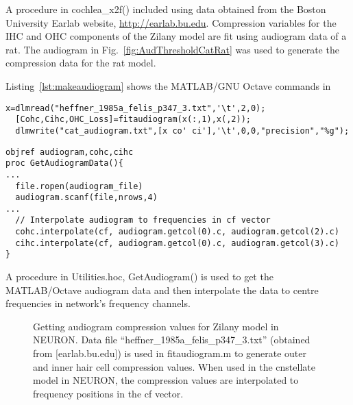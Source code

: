 A procedure in \mbox{\textsf{cochlea\_x2f()}} included using data obtained from
the Boston University Earlab website, \url{http://earlab.bu.edu}.
Compression variables for the IHC and OHC components of the Zilany
model are fit using audiogram data of a rat.  The audiogram in
Fig.~\ref{fig:AudThresholdCatRat} was used to generate the compression
data for the rat model.


Listing~\ref{lst:makeaudiogram} shows the MATLAB/GNU Octave commands in
\begin{lstlisting}[label=lst:makeaudiogram,caption=Using \mbox{\textsf{fitaudiogram.m}} to create COHC and CIHC vectors for the cat.]
  x=dlmread("heffner_1985a_felis_p347_3.txt",'\t',2,0);
  [Cohc,Cihc,OHC_Loss]=fitaudiogram(x(:,1),x(,2));
  dlmwrite("cat_audiogram.txt",[x co' ci'],'\t',0,0,"precision","%g");
\end{lstlisting}



\begin{lstlisting}[label=lst:getaudiogramdata,caption= Procedure to get audiogram data and interpolate to frequencies in \textsf{cf} vector (\mbox{\textsf{Utilities.hoc}})]
objref audiogram,cohc,cihc
proc GetAudiogramData(){
...
  file.ropen(audiogram_file)
  audiogram.scanf(file,nrows,4)
...
  // Interpolate audiogram to frequencies in cf vector
  cohc.interpolate(cf, audiogram.getcol(0).c, audiogram.getcol(2).c)
  cihc.interpolate(cf, audiogram.getcol(0).c, audiogram.getcol(3).c)
}
\end{lstlisting}

A procedure in \mbox{\textsf{Utilities.hoc}}, \mbox{\textsf{GetAudiogram()}} is used
to get the MATLAB/Octave audiogram data and then interpolate the data
to centre frequencies in network's frequency channels.

\begin{figure}[th]
  \begin{center}
    \caption[Zilany auditory model conversion in NEURON]%
    {Getting audiogram compression values for Zilany model in
      NEURON\@.  Data file
      \mbox{\textsf{``heffner\_1985a\_felis\_p347\_3.txt''}} (obtained
      from [earlab.bu.edu]) is used in \textsf{fitaudiogram.m} to
      generate outer and inner hair cell compression values.  When
      used in the \textsf{cnstellate} model in NEURON, the compression
      values are interpolated to frequency positions in the
      \textsf{cf} vector.
\label{fig:GetAudiogram}}
  \end{center}
\end{figure}

